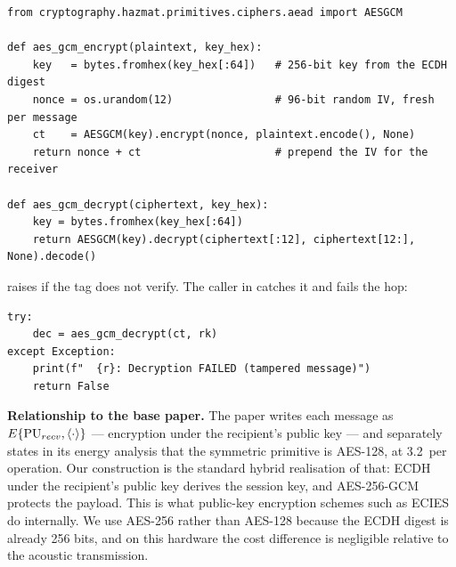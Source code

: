 \begin{lstlisting}[style=py,caption={After: AES-256-GCM (\code{uwc\_simulation.py},
lines 50--58).}]
from cryptography.hazmat.primitives.ciphers.aead import AESGCM

def aes_gcm_encrypt(plaintext, key_hex):
    key   = bytes.fromhex(key_hex[:64])   # 256-bit key from the ECDH digest
    nonce = os.urandom(12)                # 96-bit random IV, fresh per message
    ct    = AESGCM(key).encrypt(nonce, plaintext.encode(), None)
    return nonce + ct                     # prepend the IV for the receiver

def aes_gcm_decrypt(ciphertext, key_hex):
    key = bytes.fromhex(key_hex[:64])
    return AESGCM(key).decrypt(ciphertext[:12], ciphertext[12:], None).decode()
\end{lstlisting}

 raises  if the tag does not verify. The caller in
 catches it and fails the hop:

\begin{lstlisting}[style=good,caption={Tamper detection at the call site (lines 188--192).}]
try:
    dec = aes_gcm_decrypt(ct, rk)
except Exception:
    print(f"  {r}: Decryption FAILED (tampered message)")
    return False
\end{lstlisting}

\begin{okbox}
\textbf{Relationship to the base paper.} The paper writes each message as
$E\{\mathrm{PU}_{recv}, \langle \cdot \rangle\}$ --- encryption under the recipient's public key ---
and separately states in its energy analysis that the symmetric primitive is AES-128, at
3.2\,\uJ{} per operation. Our construction is the standard hybrid realisation of that:
ECDH under the recipient's public key derives the session key, and AES-256-GCM protects the
payload. This is what public-key encryption schemes such as ECIES do internally. We use
AES-256 rather than AES-128 because the ECDH digest is already 256 bits, and on this
hardware the cost difference is negligible relative to the acoustic transmission.
\end{okbox}

